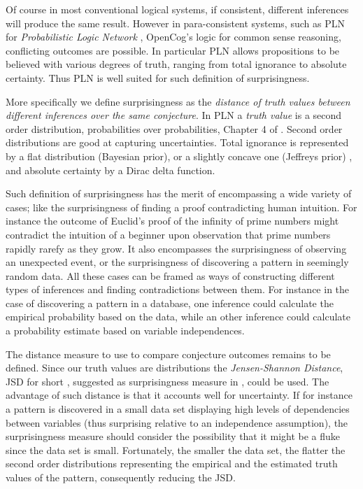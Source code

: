 \documentclass[runningheads]{llncs}
\begin{document}
Of course in most conventional logical systems, if consistent,
different inferences will produce the same result. However in
para-consistent systems, such as PLN for \emph{Probabilistic Logic
  Network} \cite{Goertzel2009PLN}, OpenCog's logic for common sense
reasoning, conflicting outcomes are possible. In particular PLN allows
propositions to be believed with various degrees of truth, ranging
from total ignorance to absolute certainty. Thus PLN is well suited
for such definition of surprisingness.

More specifically we define surprisingness as the \emph{distance of
  truth values between different inferences over the same
  conjecture}. In PLN a \emph{truth value} is a second order
distribution, probabilities over probabilities, Chapter 4 of
\cite{Goertzel2009PLN}. Second order distributions are good at
capturing uncertainties. Total ignorance is represented by a flat
distribution (Bayesian prior), or a slightly concave one (Jeffreys
prior)%
, and absolute certainty by a Dirac delta function.

Such definition of surprisingness has the merit of encompassing a wide
variety of cases; like the surprisingness of finding a proof
contradicting human intuition. For instance the outcome of Euclid's
proof of the infinity of prime numbers might contradict the intuition
of a beginner upon observation that prime numbers rapidly rarefy as
they grow. It also encompasses the surprisingness of observing an
unexpected event, or the surprisingness of discovering a pattern in
seemingly random data. All these cases can be framed as ways of
constructing different types of inferences and finding contradictions
between them. For instance in the case of discovering a pattern in a
database, one inference could calculate the empirical probability
based on the data, while an other inference could calculate a
probability estimate based on variable independences.

The distance measure to use to compare conjecture outcomes remains to
be defined. Since our truth values are distributions the
\emph{Jensen-Shannon Distance}, JSD for short \cite{Endres2003A},
suggested as surprisingness measure in \cite{Pienta2015AN},
could be used. The advantage of such distance is that it accounts well
for uncertainty. If for instance a pattern is discovered in a small
data set displaying high levels of dependencies between variables
(thus surprising relative to an independence assumption), the
surprisingness measure should consider the possibility that it might
be a fluke since the data set is small. Fortunately, the smaller the
data set, the flatter the second order distributions representing the
empirical and the estimated truth values of the pattern, consequently
reducing the JSD.
\end{document}
